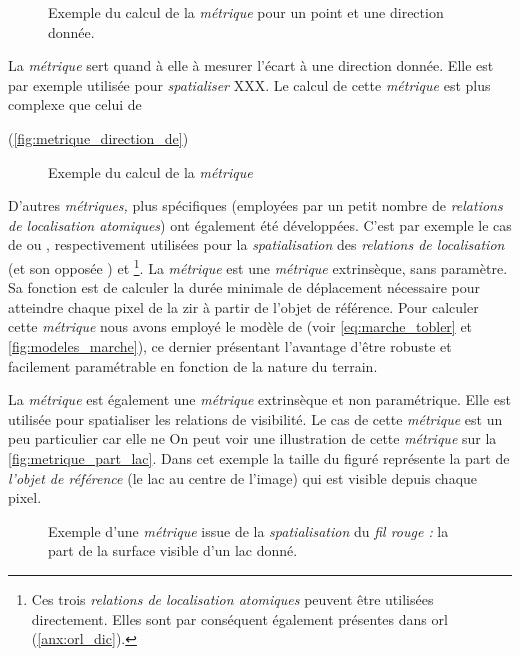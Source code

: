 \begin{figure}
  \centering
  
  \caption{Exemple du calcul de la \emph{métrique}
    \protect{} pour un point et une direction
    donnée.}
  \label{fig:metrique_ecart_angulaire}
\end{figure}

La \emph{métrique}  sert quand à elle à mesurer
l'écart à une direction donnée. Elle est par exemple utilisée pour
\emph{spatialiser} XXX.
%
Le calcul de cette \emph{métrique} est plus complexe que celui de

%
(\autoref{fig:metrique_direction_de})

\begin{figure}
  \centering
  
  \caption{Exemple du calcul de la \emph{métrique}
    \protect{}}
  \label{fig:metrique_direction_de}
\end{figure}

D'autres \emph{métriques,} plus spécifiques (\ie employées par un
petit nombre de \emph{relations de localisation atomiques}) ont
également été développées. C'est par exemple le cas de
 ou , respectivement
utilisées pour la \emph{spatialisation} des \emph{relations de
  localisation}  (et son opposée
) et 
\footnote{Ces trois \emph{relations de localisation atomiques} peuvent
  être utilisées directement. Elles sont par conséquent également
  présentes dans \ac{orl} (\autoref{anx:orl_dic}).}. La
\emph{métrique}  est une \emph{métrique}
extrinsèque, sans paramètre. Sa fonction est de calculer la durée
minimale de déplacement nécessaire pour atteindre chaque pixel de la
\ac{zir} à partir de l'objet de référence. Pour calculer cette
\emph{métrique} nous avons employé le modèle de \textcite{Tobler1993}
(voir \autoref{eq:marche_tobler} et \autoref{fig:modeles_marche}), ce
dernier présentant l'avantage d'être robuste et facilement
paramétrable en fonction de la nature du terrain.

La \emph{métrique}  est également une
\emph{métrique} extrinsèque et non paramétrique. Elle est utilisée
pour spatialiser les relations de visibilité. Le cas de cette
\emph{métrique} est un peu particulier car elle ne 
%
On peut voir une illustration de cette \emph{métrique} sur la
\autoref{fig:metrique_part_lac}. Dans cet exemple la taille du figuré
représente la part de \emph{l'objet de référence} (le lac au centre de
l'image) qui est visible depuis chaque pixel.

\begin{figure}
  \centering
  
  \caption{Exemple d'une \emph{métrique} issue de la
    \emph{spatialisation} du \emph{fil rouge :} la part de la surface
    visible d'un lac donné.}
  \label{fig:metrique_part_lac}
\end{figure}


